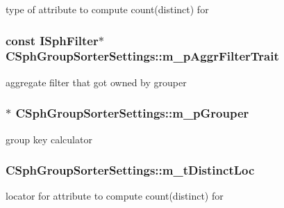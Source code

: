 type of attribute to compute count(distinct) for 

\hypertarget{structCSphGroupSorterSettings_aa5f8d2e3257a5a814ff144f78fde90d7}{
\subsubsection[{m\-\_\-p\-Aggr\-Filter\-Trait}]{\setlength{\rightskip}{0pt plus 5cm}const {\bf I\-Sph\-Filter}$\ast$ C\-Sph\-Group\-Sorter\-Settings\-::m\-\_\-p\-Aggr\-Filter\-Trait}}\label{structCSphGroupSorterSettings_aa5f8d2e3257a5a814ff144f78fde90d7}


aggregate filter that got owned by grouper 

\hypertarget{structCSphGroupSorterSettings_af976f035f4367a4ec872d85c16c1a83d}{
\subsubsection[{m\-\_\-p\-Grouper}]{$\ast$ C\-Sph\-Group\-Sorter\-Settings\-::m\-\_\-p\-Grouper}}\label{structCSphGroupSorterSettings_af976f035f4367a4ec872d85c16c1a83d}


group key calculator 

\hypertarget{structCSphGroupSorterSettings_a84e448e7c765cdc8f4674a577f3ff6b1}{
\subsubsection[{m\-\_\-t\-Distinct\-Loc}]{ C\-Sph\-Group\-Sorter\-Settings\-::m\-\_\-t\-Distinct\-Loc}}\label{structCSphGroupSorterSettings_a84e448e7c765cdc8f4674a577f3ff6b1}


locator for attribute to compute count(distinct) for 

